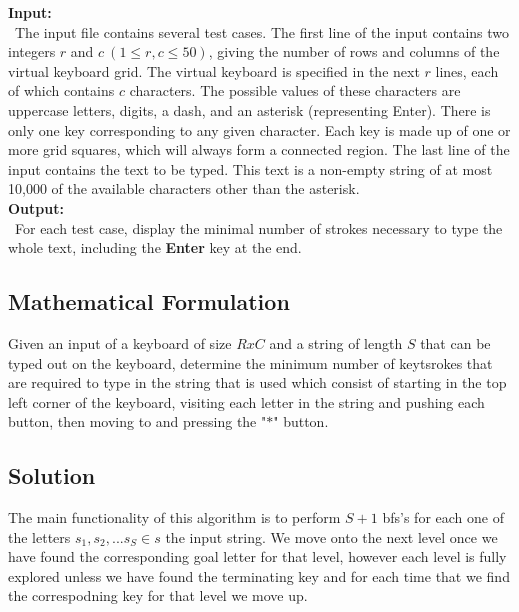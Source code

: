 \documentclass[12pt]{article}
\begin{document}
\noindent \textbf{Input:} \\
~\indent The input file contains several test cases. The  first line of the input contains two integers $r$ and
$c\ (1 \leq r,c \leq 50)$, giving the number of rows
and columns of the virtual keyboard grid. The virtual keyboard is specified in the next $r$ lines, each of which
contains $c$ characters. The possible values of these characters are uppercase letters, digits, a
dash, and an asterisk (representing Enter). There is only one key corresponding to any given character.
Each key is made up of one or more grid squares, which will always form a connected region. The last
line of the input contains the text to be typed. This text is a non-empty string of at most 10,000 of
the available characters other than the asterisk. \\

\noindent \textbf{Output:} \\
~\indent For each test case, display the minimal number of strokes necessary to type the whole text, including
the \textbf{Enter} key at the end.



\newpage

\subsection{Mathematical Formulation}
Given an input of a keyboard of size $RxC$ and a string of length $S$ that can be typed out on the keyboard,
determine the minimum number of keytsrokes that are required to type in the string that is used which consist
of starting in the top left corner of the keyboard, visiting each letter in the string and pushing each button,
then moving to and pressing the "$\ast$" button.



\subsection{Solution}
The main functionality of this algorithm is to perform $S+1$ bfs's for each one of the letters $s_1, s_2,...s_S \in s$
the input string. We move onto the next level once we have found the corresponding goal letter for that level,
however each level is fully explored unless we have found the terminating key and for each time that we find
the correspodning key for that level we move up. \\
\end{document}
